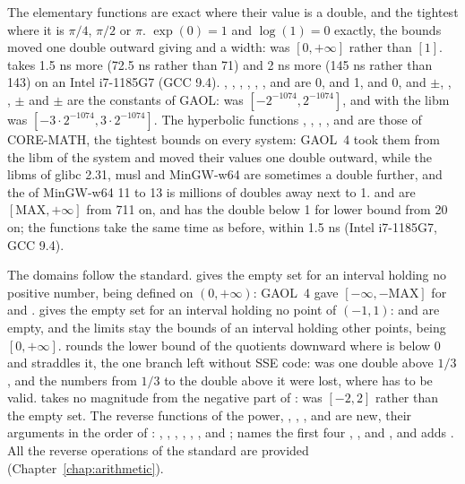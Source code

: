 \documentclass[12pt,a4paper,twoside,openright]{book}
\begin{document}
\medskip
The elementary functions are exact where their value is a double, and the
tightest where it is $\pi/4$, $\pi/2$ or $\pi$.\newinvfive{} $\exp(0) = 1$
and $\log(1) = 0$ exactly, the bounds moved one double outward giving
 and  a width:  was
$[0, +\infty]$ rather than $[1]$.  takes 1.5 ns more (72.5 ns
rather than 71) and  2 ns more (145 ns rather than 143) on
an Intel i7-1185G7 (GCC 9.4). , , ,
, , ,  and
 are 0,  and  1, 
and  0, and $\pm$, ,
, $\pm$ and $\pm$
are the constants of GAOL:  was
$[-2^{-1074}, 2^{-1074}]$, and  with the libm was
$[-3 \cdot 2^{-1074}, 3 \cdot 2^{-1074}]$. The hyperbolic functions
, , , ,  and
 are those of CORE-MATH, the tightest bounds on every system:
GAOL~4 took them from the libm of the system and moved their values one double
outward, while the libms of glibc 2.31, musl and MinGW-w64 are sometimes a
double further, and the  of MinGW-w64 11 to 13 is millions of
doubles away next to 1.  and  are
$[\mathrm{MAX}, +\infty]$ from 711 on, and  has the double below
1 for lower bound from 20 on; the functions take the same time as before,
within 1.5 ns (Intel i7-1185G7, GCC 9.4).

\medskip
The domains follow the standard.\newinvfive{}  gives the empty
set for an interval holding no positive number,  being defined on
$(0, +\infty)$: GAOL~4 gave $[-\infty, -\mathrm{MAX}]$ for  and .  gives the empty set for an interval
holding no point of $(-1, 1)$:  and 
are empty, and the limits stay the bounds of an interval holding other
points,  being $[0, +\infty]$.  rounds
the lower bound of the quotients downward where  is below 0 and
 straddles it, the one branch left without SSE code:
 was one double above $1/3$, and the
numbers from $1/3$ to the double above it were lost, where  has
to be valid.  takes no magnitude from the negative part
of :  was $[-2, 2]$ rather than
the empty set. The reverse functions of the power, , ,
,  and  are new, their arguments in the
order of : ,
, ,
, ,
,  and ;  names the first four ,
,  and , and adds
. All the reverse operations of the standard are
provided (Chapter~\ref{chap:arithmetic}).
\end{document}
